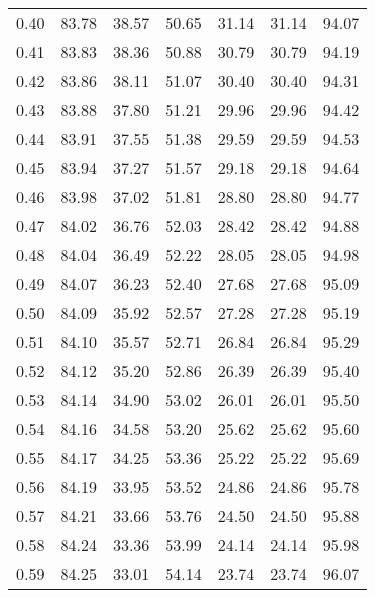 \begin{tabular}{|c|c|c|c|c|c|c|}
      0.40 &     83.78 &     38.57 &      50.65 &   31.14 &      31.14 &         94.07 \\
      0.41 &     83.83 &     38.36 &      50.88 &   30.79 &      30.79 &         94.19 \\
      0.42 &     83.86 &     38.11 &      51.07 &   30.40 &      30.40 &         94.31 \\
      0.43 &     83.88 &     37.80 &      51.21 &   29.96 &      29.96 &         94.42 \\
      0.44 &     83.91 &     37.55 &      51.38 &   29.59 &      29.59 &         94.53 \\
      0.45 &     83.94 &     37.27 &      51.57 &   29.18 &      29.18 &         94.64 \\
      0.46 &     83.98 &     37.02 &      51.81 &   28.80 &      28.80 &         94.77 \\
      0.47 &     84.02 &     36.76 &      52.03 &   28.42 &      28.42 &         94.88 \\
      0.48 &     84.04 &     36.49 &      52.22 &   28.05 &      28.05 &         94.98 \\
      0.49 &     84.07 &     36.23 &      52.40 &   27.68 &      27.68 &         95.09 \\
      0.50 &     84.09 &     35.92 &      52.57 &   27.28 &      27.28 &         95.19 \\
      0.51 &     84.10 &     35.57 &      52.71 &   26.84 &      26.84 &         95.29 \\
      0.52 &     84.12 &     35.20 &      52.86 &   26.39 &      26.39 &         95.40 \\
      0.53 &     84.14 &     34.90 &      53.02 &   26.01 &      26.01 &         95.50 \\
      0.54 &     84.16 &     34.58 &      53.20 &   25.62 &      25.62 &         95.60 \\
      0.55 &     84.17 &     34.25 &      53.36 &   25.22 &      25.22 &         95.69 \\
      0.56 &     84.19 &     33.95 &      53.52 &   24.86 &      24.86 &         95.78 \\
      0.57 &     84.21 &     33.66 &      53.76 &   24.50 &      24.50 &         95.88 \\
      0.58 &     84.24 &     33.36 &      53.99 &   24.14 &      24.14 &         95.98 \\
      0.59 &     84.25 &     33.01 &      54.14 &   23.74 &      23.74 &         96.07 \\

\end{tabular}
